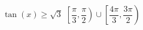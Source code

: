 { $\tan \left( x \right) \geq \sqrt{3}$}
{ $\left[ \dfrac{\pi}{3}, \dfrac{\pi}{2} \right) \cup \left[ \dfrac{4\pi}{3}, \dfrac{3\pi}{2} \right)$}
